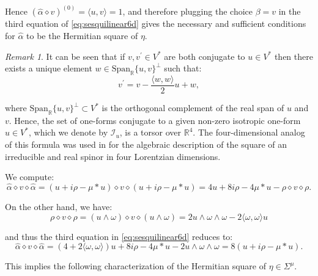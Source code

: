 \documentclass[10pt,a4paper,twoside,reqno]{amsart}
\theoremstyle{plain}
\theoremstyle{definition}
\theoremstyle{remark}
\newtheorem{remark}[thm]{Remark}
\def\R{\mathbb{R}}
\def\cI{\mathcal{I}}
\def\R{\mathbb{R}}
\newcommand{\escal}[1]{\langle#1\rangle}
\def\Span{\mathrm{Span}}
\begin{document}
\noindent
Hence $(\widehat{\alpha}\diamond v)^{(0)}=\escal{u,v}=1$, and therefore plugging the choice $\beta = v$ in the third equation of \eqref{eq:sesquilinear6d} gives the necessary and sufficient conditions for $\widehat{\alpha}$ to be the Hermitian square of $\eta$.

\begin{remark}
It can be seen that if $v, v^{\prime} \in V^{\ast}$ are both conjugate to $u\in V^{\ast}$ then there exists a unique element $w\in \Span_\R\{u,v\}^{\perp}$ such that:
\begin{equation*}
v^{\prime} = v - \frac{\escal{w,w}}{2} u + w,
\end{equation*}

\noindent
where $\Span_\R\{u,v\}^{\perp} \subset V^{\ast}$ is the orthogonal complement of the real span of $u$ and $v$. Hence, the set of one-forms conjugate to a given non-zero isotropic one-form $u\in V^{\ast}$, which we denote by $\cI_u$, is a torsor over $\mathbb{R}^4$. The four-dimensional analog of this formula was used in \cite{Shahbazi:2025qnl} for the algebraic description of the square of an irreducible and real spinor in four Lorentzian dimensions.
\end{remark}

\noindent
We compute:
\begin{equation*}
\widehat{\alpha}\diamond v\diamond \widehat{\alpha} = (u + i \rho  - \mu \ast u) \diamond v \diamond (u + i \rho  - \mu \ast u)  = 4 u + 8 i \rho - 4\mu \ast u - \rho \diamond v\diamond \rho.
\end{equation*}

\noindent
On the other hand, we have:
\begin{equation*}
\rho \diamond v\diamond \rho =(u\wedge \omega) \diamond v \diamond (u\wedge \omega) = 2 u \wedge \omega\wedge \omega - 2\escal{\omega,\omega}u
\end{equation*}

\noindent
and thus the third equation in \eqref{eq:sesquilinear6d} reduces to:
\begin{equation*}
\widehat{\alpha}\diamond v\diamond \widehat{\alpha} = (4 + 2\escal{\omega,\omega})u + 8 i \rho - 4\mu \ast u - 2u \wedge \omega \wedge \omega = 8(u + i \rho  - \mu \ast u).
\end{equation*}

\noindent
This implies the following characterization of the Hermitian square of $\eta \in \Sigma^{\mu}$.
\end{document}
